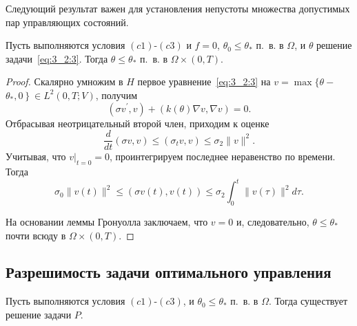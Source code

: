 Следующий результат важен для установления непустоты
множества допустимых пар управляющих состояний.

\begin{lemma}
    \label{lm:3_2:2}
    Пусть выполняются условия $(c1)$-$(c3)$ и
    $f=0$, $\theta_{0} \leq \theta_{*}$ п.\ в. в $\Omega$,
    и $\theta$ решение задачи~\eqref{eq:3_2:3}.
    Тогда $\theta \leq \theta_{*}$ п.\ в. в $\Omega \times(0, T)$.
\end{lemma}

\begin{proof}
    Скалярно умножим в $H$ первое уравнение~\eqref{eq:3_2:3} на
    $v=\max \{\theta-$ $\left.\theta_{*}, 0\right\} \in L^{2}(0, T ; V)$, получим
    \[
        \left(\sigma v^{\prime}, v\right)+(k(\theta) \nabla v, \nabla v)=0.
    \]
    Отбрасывая неотрицательный второй член, приходим к оценке
    \[ \frac{d}{d t}(\sigma v, v) \leq\left(\sigma_{t} v, v\right) \leq \sigma_{2}\|v\|^{2}. \]
    Учитывая, что $\left.v\right|_{t=0}=0$, проинтегрируем
    последнее неравенство по времени.
    Тогда
    \[
        \sigma_{0}\|v(t)\|^{2} \leq(\sigma v(t), v(t))
        \leq \sigma_{2} \int_{0}^{t}\|v(\tau)\|^{2} d \tau.
    \]

    На основании леммы Гронуолла заключаем,
    что $v=0$ и, следовательно, $\theta \leq \theta_{*}$ почти всюду в $\Omega\times(0,T)$.
\end{proof}

\subsection{Разрешимость задачи оптимального управления}
\label{subsec:ch3:sec2:subsec5}

\begin{theorem}
    \label{th:3_2:1}
    Пусть выполняются условия $(c1)$-$(c3)$, и $\theta_{0} \leq \theta_{*}$ п.\ в. в $\Omega$.
    Тогда существует решение задачи $P$.
\end{theorem}

